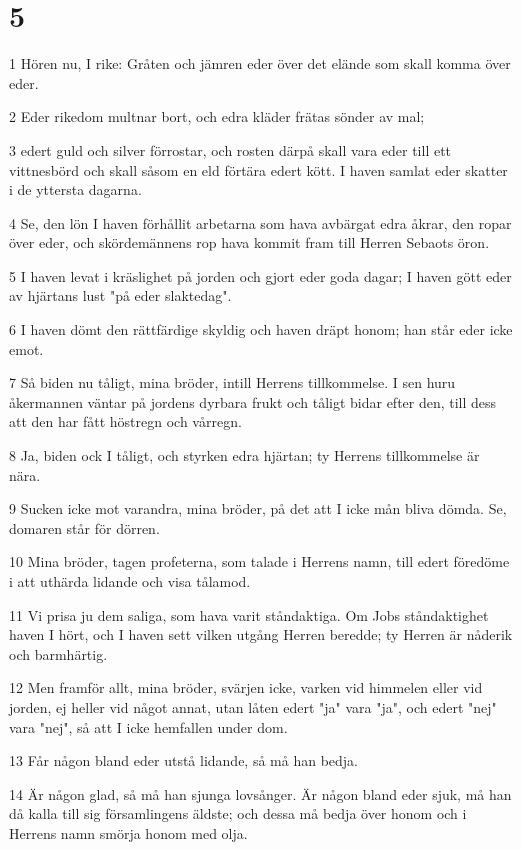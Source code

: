 \chapter{5}

\par 1 Hören nu, I rike: Gråten och jämren eder över det elände som skall komma över eder.
\par 2 Eder rikedom multnar bort, och edra kläder frätas sönder av mal;
\par 3 edert guld och silver förrostar, och rosten därpå skall vara eder till ett vittnesbörd och skall såsom en eld förtära edert kött. I haven samlat eder skatter i de yttersta dagarna.
\par 4 Se, den lön I haven förhållit arbetarna som hava avbärgat edra åkrar, den ropar över eder, och skördemännens rop hava kommit fram till Herren Sebaots öron.
\par 5 I haven levat i kräslighet på jorden och gjort eder goda dagar; I haven gött eder av hjärtans lust "på eder slaktedag".
\par 6 I haven dömt den rättfärdige skyldig och haven dräpt honom; han står eder icke emot.
\par 7 Så biden nu tåligt, mina bröder, intill Herrens tillkommelse. I sen huru åkermannen väntar på jordens dyrbara frukt och tåligt bidar efter den, till dess att den har fått höstregn och vårregn.
\par 8 Ja, biden ock I tåligt, och styrken edra hjärtan; ty Herrens tillkommelse är nära.
\par 9 Sucken icke mot varandra, mina bröder, på det att I icke mån bliva dömda. Se, domaren står för dörren.
\par 10 Mina bröder, tagen profeterna, som talade i Herrens namn, till edert föredöme i att uthärda lidande och visa tålamod.
\par 11 Vi prisa ju dem saliga, som hava varit ståndaktiga. Om Jobs ståndaktighet haven I hört, och I haven sett vilken utgång Herren beredde; ty Herren är nåderik och barmhärtig.
\par 12 Men framför allt, mina bröder, svärjen icke, varken vid himmelen eller vid jorden, ej heller vid något annat, utan låten edert "ja" vara "ja", och edert "nej" vara "nej", så att I icke hemfallen under dom.
\par 13 Får någon bland eder utstå lidande, så må han bedja.
\par 14 Är någon glad, så må han sjunga lovsånger. Är någon bland eder sjuk, må han då kalla till sig församlingens äldste; och dessa må bedja över honom och i Herrens namn smörja honom med olja.

